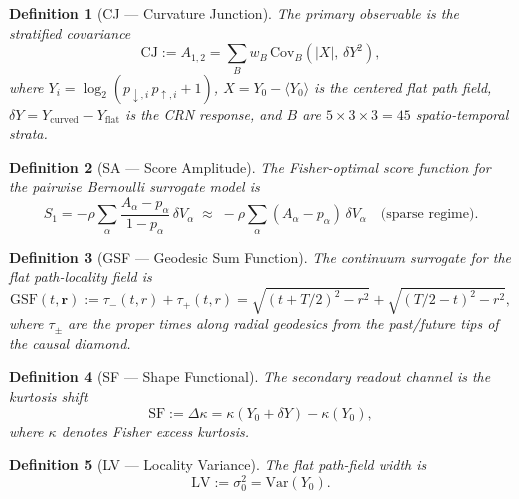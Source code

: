 \documentclass[12pt,a4paper]{article}
\newtheorem{definition}{Definition}
\begin{document}
\begin{definition}[CJ --- Curvature Junction]
The primary observable is the stratified covariance
\begin{equation}
  \mathrm{CJ} := A_{1,2} = \sum_B w_B\,\mathrm{Cov}_B\!\left(|X|,\,\delta Y^2\right),
\end{equation}
where $Y_i = \log_2(p_{\downarrow,i}\,p_{\uparrow,i} + 1)$, $X = Y_0 - \langle Y_0\rangle$ is the centered flat path field, $\delta Y = Y_{\mathrm{curved}} - Y_{\mathrm{flat}}$ is the CRN response, and $B$ are $5\!\times\!3\!\times\!3 = 45$ spatio-temporal strata.
\end{definition}

\begin{definition}[SA --- Score Amplitude]
The Fisher-optimal score function for the pairwise Bernoulli surrogate model is
\begin{equation}
  S_1 = -\rho \sum_\alpha \frac{A_\alpha - p_\alpha}{1 - p_\alpha}\,\delta V_\alpha
  \;\approx\; -\rho \sum_\alpha (A_\alpha - p_\alpha)\,\delta V_\alpha
  \quad\text{(sparse regime)}.
\end{equation}
\end{definition}

\begin{definition}[GSF --- Geodesic Sum Function]
The continuum surrogate for the flat path-locality field is
\begin{equation}
  \mathrm{GSF}(t,\mathbf{r}) := \tau_-(t,r) + \tau_+(t,r)
  = \sqrt{(t + T/2)^2 - r^2} + \sqrt{(T/2 - t)^2 - r^2},
\end{equation}
where $\tau_\pm$ are the proper times along radial geodesics from the past/future tips of the causal diamond.
\end{definition}

\begin{definition}[SF --- Shape Functional]
The secondary readout channel is the kurtosis shift
\begin{equation}
  \mathrm{SF} := \Delta\kappa = \kappa(Y_0 + \delta Y) - \kappa(Y_0),
\end{equation}
where $\kappa$ denotes Fisher excess kurtosis.
\end{definition}

\begin{definition}[LV --- Locality Variance]
The flat path-field width is
\begin{equation}
  \mathrm{LV} := \sigma_0^2 = \mathrm{Var}(Y_0).
\end{equation}
\end{definition}
\end{document}
